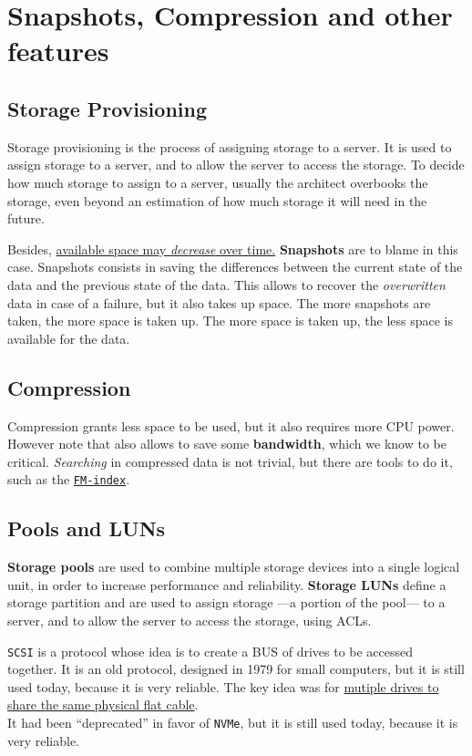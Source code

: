 \section{Snapshots, Compression and other features}
\subsection{Storage Provisioning}
Storage provisioning is the process of assigning storage to a server. It is used to assign storage to a server, and to allow the server to access the storage.
To decide how much storage to assign to a server, usually the architect overbooks the storage, even beyond an estimation of how much storage it will need in the future.

Besides, \ul{available space may \textit{decrease} over time.}
\textbf{Snapshots} are to blame in this case. Snapshots consists in saving the differences between the current state of the data and the previous state of the data. This allows to recover the \textit{overwritten} data in case of a failure, but it also takes up space. The more snapshots are taken, the more space is taken up. The more space is taken up, the less space is available for the data.

\subsection{Compression}
Compression grants less space to be used, but it also requires more CPU power. However note that also allows to save some \textbf{bandwidth}, which we know to be critical.
\textit{Searching} in compressed data is not trivial, but there are tools to do it, such as the \href{https://en.wikipedia.org/wiki/FM-index}{\texttt{FM-index}}.

\subsection{Pools and LUNs}

\textbf{Storage pools} 
are used to combine multiple storage devices into a single logical unit, in order to increase performance and reliability. 
\textbf{Storage LUNs} define a storage partition and are used to assign storage ---a portion of the pool--- to a server, and to allow the server to access the storage, using ACLs.

\texttt{SCSI} is a protocol whose idea is to create a BUS of drives to be accessed together. It is an old protocol, designed in 1979 for small computers, but it is still used today, because it is very reliable.
The key idea was for \ul{mutiple drives to share the same physical flat cable}.\\
It had been ``deprecated'' in favor of \texttt{NVMe}, but it is still used today, because it is very reliable.


